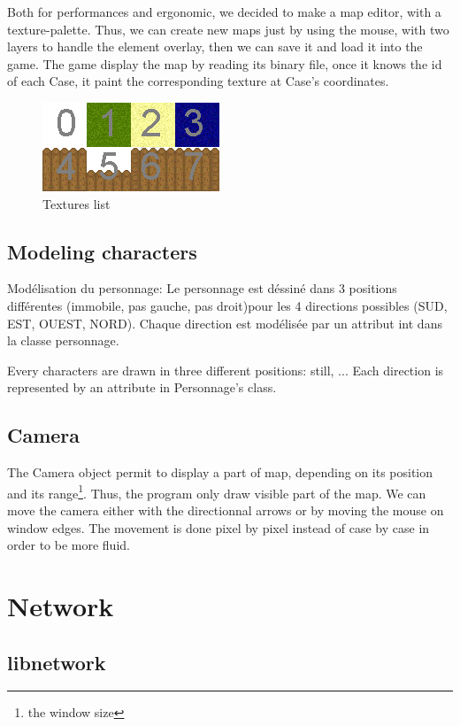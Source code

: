 \documentclass{scrreprt}
\begin{document}
Both for performances and ergonomic, we decided to make a map editor, with a texture-palette. Thus, we can create new maps just by using the mouse, with two layers to handle the element overlay, then we can save it and load it into the game. The game display the map by reading its binary file, once it knows the id of each Case, it paint the corresponding texture at Case's coordinates.

\begin{figure}
\begin{center}
\includegraphics{image1.png}
\end{center}
\caption{Textures list}
\end{figure}

\subsection{Modeling characters}
Modélisation du personnage:
Le personnage est déssiné dans 3 positions différentes (immobile, pas gauche, pas droit)pour les 4 directions possibles (SUD, EST, OUEST, NORD). Chaque direction est modélisée par un attribut int dans la classe personnage.

Every characters are drawn in three different positions: still, ... Each direction is represented by an attribute in Personnage's class.
\subsection{Camera}
The Camera object permit to display a part of map, depending on its position and its range\footnote{the window size}. Thus, the program only draw visible part of the map. We can move the camera either with the directionnal arrows or by moving the mouse on window edges. The movement is done pixel by pixel instead of case by case in order to be more fluid.

\section{Network}
\subsection{libnetwork}
\end{document}
